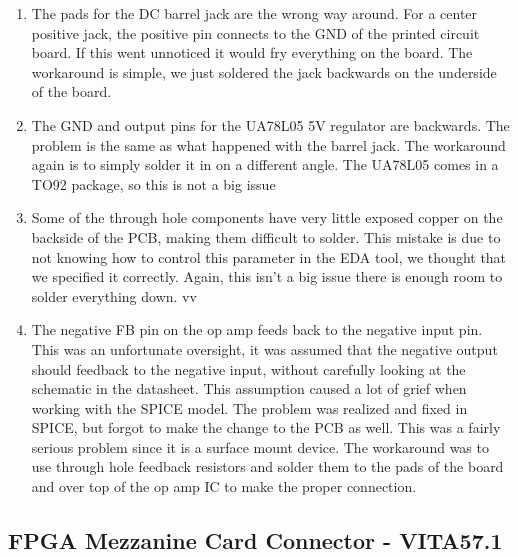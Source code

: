 \documentclass[a4paper, 12pt, notitlepage]{article}
\begin{document}
\begin{enumerate}
  \item{
    The pads for the DC barrel jack are the wrong way around.  For a center positive jack, the positive pin connects to the GND of the printed circuit board.  If this went unnoticed it would fry everything on the board.  The workaround is simple, we just soldered the jack backwards on the underside of the board.
  }

  \item{
    The GND and output pins for the UA78L05 5V regulator are backwards.  The problem is the same as what happened with the barrel jack.  The workaround again is to simply solder it in on a different angle.  The UA78L05 comes in a TO92 package, so this is not a big issue
  }

  \item{
    Some of the through hole components have very little exposed copper on the backside of the PCB, making them difficult to solder.  This mistake is due to not knowing how to control this parameter in the EDA tool, we thought that we specified it correctly.  Again, this isn't a big issue there is enough room to solder everything down.
    }
vv
  \item{ %
    The negative FB pin on the op amp feeds back to the negative input pin.  This was an unfortunate oversight, it was assumed that the negative output should feedback to the negative input, without carefully looking at the schematic in the datasheet.  This assumption caused a lot of grief when working with the SPICE model.  The problem was realized and fixed in SPICE, but forgot to make the change to the PCB as well.  This was a fairly serious problem since it is a surface mount device.  The workaround was to use through hole feedback resistors and solder them to the pads of the board and over top of the op amp IC to make the proper connection.
  }

\end{enumerate}

\subsection{FPGA Mezzanine Card Connector - VITA57.1}

\clearpage


\end{document}
